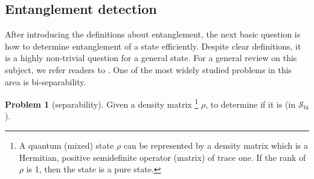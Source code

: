 \documentclass[
aps,
pra,
twocolumn,
floatfix,
]{revtex4-2}
\theoremstyle{plain}
\theoremstyle{definition}
\newtheorem{problem}{Problem}
\newtheorem{remark}{Remark}
\newcommand{\dm}{\rho}
\newcommand{\bi}{\text{bi}}
\newcommand{\separableset}{\mathcal{S}}
\begin{document}





\subsection{Entanglement detection}
After introducing the definitions about entanglement, 
the next basic question is how to determine entanglement of a state efficiently.
Despite clear definitions, it is a highly non-trivial question for a general state.
For a general review on this subject, we refer readers to \cite{guhneEntanglementDetection2009}.
One of the most widely studied problems in this area is bi-separability.
\begin{problem}[separability]\label{prm:separability}
	Given a density matrix 
	\footnote{
		A quantum (mixed) state $\dm$ can be represented by a density matrix which is a Hermitian, positive semidefinite operator (matrix) of trace one. If the rank of $\dm$ is 1, then the state is a pure state.
	}
	$\dm$, to determine if it is  (in $\separableset_{\bi}$).
\end{problem}
\end{document}
